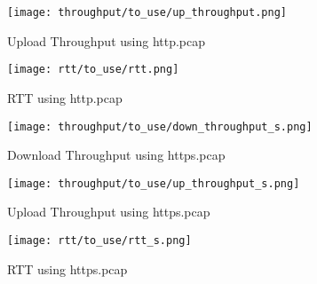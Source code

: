 \documentclass[12pt]{article}
\begin{document}
\begin{enumerate}
\begin{enumerate}
\begin{figure}[h!]
            \texttt{[image: throughput/to\_use/up\_throughput.png]}
            \caption{Upload Throughput using http.pcap}
        \end{figure}
        \begin{figure}[h!]
            \centering
            \texttt{[image: rtt/to\_use/rtt.png]}
            \caption{RTT using http.pcap}
        \end{figure}
        \begin{figure}[h!]
            \centering
            \texttt{[image: throughput/to\_use/down\_throughput\_s.png]}
            \caption{Download Throughput using https.pcap}
        \end{figure}
        \begin{figure}[h!]
            \centering
            \texttt{[image: throughput/to\_use/up\_throughput\_s.png]}
            \caption{Upload Throughput using https.pcap}
        \end{figure}
        \begin{figure}[h!]
            \centering
            \texttt{[image: rtt/to\_use/rtt\_s.png]}
            \caption{RTT using https.pcap}
        \end{figure}
    \end{enumerate}
    
\end{enumerate}
\end{document}
